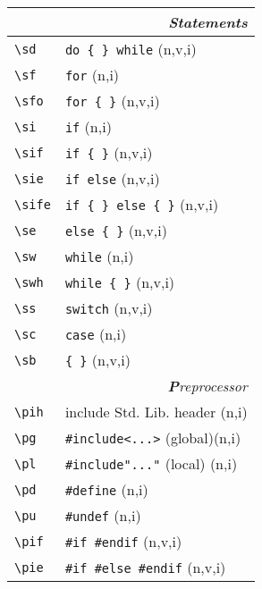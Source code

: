 \documentclass[oneside,11pt,landscape,DIV16]{scrartcl}
\begin{document}
\begin{multicols}{3}
\begin{center}
\begin{tabular}[]{|p{15mm}|p{55mm}|}
\hline
\multicolumn{2}{|r|}{\textsl{\textbf{S}tatements}} \\
\hline \verb'\sd'  & \verb'do { } while'        \hfill (n,v,i)\\
\hline \verb'\sf'  & \verb'for'                 \hfill (n,i)\\
\hline \verb'\sfo' & \verb'for { }'             \hfill (n,v,i)\\
\hline \verb'\si'  & \verb'if'                  \hfill (n,i)\\
\hline \verb'\sif' & \verb'if { }'              \hfill (n,v,i)\\
\hline \verb'\sie' & \verb'if else'             \hfill (n,v,i)\\
\hline \verb'\sife'& \verb'if { } else { }'     \hfill (n,v,i)\\
\hline \verb'\se'  & \verb'else { }'            \hfill (n,v,i)\\
\hline \verb'\sw'  & \verb'while'               \hfill (n,i)\\
\hline \verb'\swh' & \verb'while { }'           \hfill (n,v,i)\\
\hline \verb'\ss'  & \verb'switch'              \hfill (n,v,i)\\
\hline \verb'\sc'  & \verb'case'                \hfill (n,i)\\
\hline \verb'\sb'  & \verb'{ }'                 \hfill (n,v,i)\\
\hline
\hline
\multicolumn{2}{|r|}{\textsl{\textbf{P}reprocessor}}   \\
\hline \verb'\pih'  & include Std. Lib. header     \hfill (n,i)\\
\hline \verb'\pg'   & \verb$#include<...>$ (global)\hfill (n,i)\\
\hline \verb'\pl'   & \verb$#include"..."$ (local) \hfill (n,i)\\
\hline \verb'\pd'   & \verb'#define'               \hfill (n,i)\\
\hline \verb'\pu'   & \verb'#undef'                \hfill (n,i)\\
\hline \verb'\pif'  & \verb'#if #endif'            \hfill (n,v,i)\\
\hline \verb'\pie'  & \verb'#if #else #endif'      \hfill (n,v,i)\\

\end{tabular}
\end{center}
\end{multicols}
\end{document}
